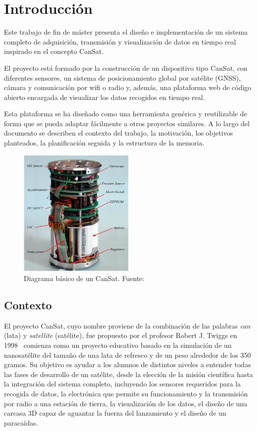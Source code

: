 \chapter{Introducción}

\label{cap:introduccion}
Este trabajo de fin de máster presenta el diseño e implementación de un sistema completo de adquisición, transmisión y visualización de datos en tiempo real inspirado en el concepto CanSat.

El proyecto está formado por la construcción de un dispositivo tipo CanSat, con diferentes sensores, un sistema de posicionamiento global por satélite (GNSS), cámara y comunicación por wifi o radio y,
además, una plataforma web de código abierto encargada de visualizar los datos recogidos en tiempo real.

Esta plataforma se ha diseñado como una herramienta genérica y reutilizable de forma que se pueda adaptar fácilmente a otros proyectos similares.
A lo largo del documento se describen el contexto del trabajo, la motivación, los objetivos planteados, la planificación seguida y la estructura de la memoria.

\begin{figure}
    \centering
    \includegraphics[width=0.5\textwidth]{Imagenes/Bitmap/cansat}
    \caption{Diagrama básico de un CanSat. Fuente: \cite{researchgate_cansat2018}}
    \label{fig:cansat}
\end{figure}


\section{Contexto}
El proyecto CanSat, cuyo nombre proviene de la combinación de las palabras \emph{can} (lata) y \emph{satellite} (satélite), fue propuesto por el profesor Robert J. Twiggs en 1998~\cite{jaxa_cansat} comienza como un proyecto educativo basado en la simulación de un nanosatélite del tamaño de una lata de refresco y de un peso alrededor de los 350 gramos.
Su objetivo es ayudar a los alumnos de distintos niveles a entender todas las fases de desarrollo de un satélite, desde la elección de la misión científica hasta la integración del sistema completo, incluyendo los sensores requeridos para la recogida de datos, la electrónica que permite su funcionamiento y la transmisión por radio a una estación de tierra,
la visualización de los datos, el diseño de una carcasa 3D capaz de aguantar la fuerza del lanzamiento y el diseño de un paracaídas.

